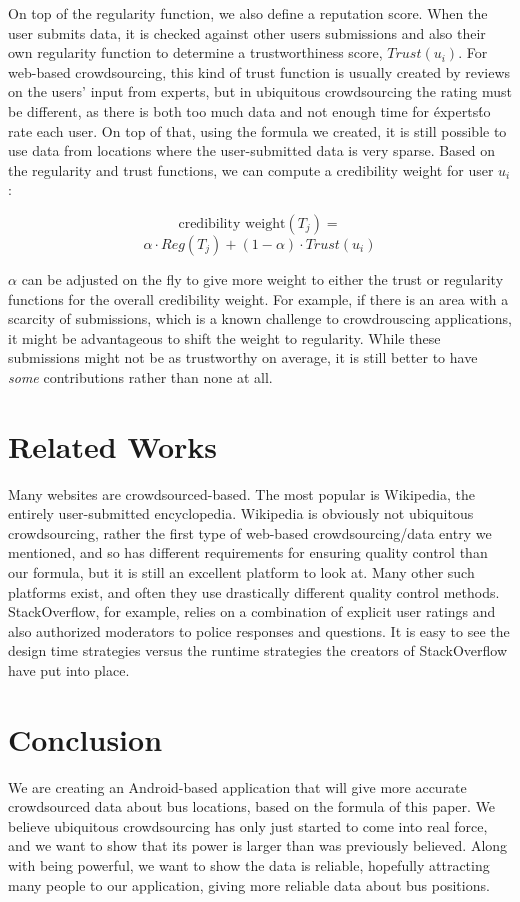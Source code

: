 \documentclass{sig-alternate-05-2015}
\begin{document}
	On top of the regularity function, we also define a reputation score. When the user submits data, it is checked against other users submissions and also their own regularity function to determine a trustworthiness score, $Trust(u_i)$. For web-based crowdsourcing, this kind of trust function is usually created by reviews on the users' input from experts, but in ubiquitous crowdsourcing the rating must be different, as there is both too much data and not enough time for \'experts\' to rate each user. On top of that, using the formula we created, it is still possible to use data from locations where the user-submitted data is very sparse. Based on the regularity and trust functions, we can compute a credibility weight for user $u_i$:
	
	$$\text{credibility weight} (T_j) = $$ 
	$$\alpha \cdot Reg(T_j) + (1 - \alpha) \cdot Trust(u_i)$$
	
	$\alpha$ can be adjusted on the fly to give more weight to either the trust or regularity functions for the overall credibility weight. For example, if there is an area with a scarcity of submissions, which is a known challenge to crowdrouscing applications, \cite{doan2011crowdsourcing} it might be advantageous to shift the weight to regularity. While these submissions might not be as trustworthy on average, it is still better to have \emph{some} contributions rather than none at all. 
	
	\section{Related Works}	
	Many websites are crowdsourced-based. The most popular is Wikipedia, the entirely user-submitted encyclopedia. Wikipedia is obviously not ubiquitous crowdsourcing, rather the first type of web-based crowdsourcing/data entry we mentioned, and so has different requirements for ensuring quality control than our formula, but it is still an excellent platform to look at. Many other such platforms exist, and often they use drastically different quality control methods. StackOverflow, for example, relies on a combination of explicit user ratings and also authorized moderators to police responses and questions. It is easy to see the design time strategies versus the runtime strategies the creators of StackOverflow have put into place. 
	
	
	\section{Conclusion}	
	We are creating an Android-based application that will give more accurate crowdsourced data about bus locations, based on the formula of this paper. We believe ubiquitous crowdsourcing has only just started to come into real force, and we want to show that its power is larger than was previously believed. Along with being powerful, we want to show the data is reliable, hopefully attracting many people to our application, giving more reliable data about bus positions. 
	
\end{document}
